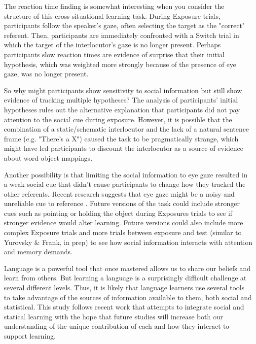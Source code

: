\documentclass[10pt,letterpaper]{article}
\begin{document}
The reaction time finding is somewhat interesting when you consider the structure of this cross-situational learning task. During Exposure trials, participants follow the speaker's gaze, often selecting the target as the "correct" referent. Then, participants are immediately confronted with a Switch trial in which the target of the interlocutor's gaze is no longer present. Perhaps participants slow reaction times are evidence of surprise that their initial hypothesis, which was weighted more strongly because of the presence of eye gaze, was no longer present. 

So why might participants show sensitivity to social information but still show evidence of tracking multiple hypotheses? The analysis of participants' initial hypotheses rules out the alternative explanation that participants did not pay attention to the social cue during exposure. However, it is possible that the combination of a static/schematic interlocutor and the lack of a natural sentence frame (e.g. "There's a X") caused the task to be pragmatically strange, which might have led participants to discount the interlocutor as a source of evidence about word-object mappings. 

Another possibility is that limiting the social information to eye gaze resulted in a weak social cue that didn't cause participants to change how they tracked the other referents. Recent research suggests that eye gaze might be a noisy and unreliable cue to reference \cite{frank2013social}. Future versions of the task could include stronger cues such as pointing or holding the object during Exposures trials to see if stronger evidence would alter learning. Future versions could also include more complex Exposure trials and more trials between exposure and test (similar to Yurovsky & Frank, in prep) to see how social information interacts with attention and memory demands. 

Language is a powerful tool that once mastered allows us to share our beliefs and learn from others. But learning a language is a surprisingly difficult challenge at several different levels. Thus, it is likely that language learners use several tools to take advantage of the sources of information available to them, both social and statistical. This study follows recent work that attempts to integrate social and statical learning with the hope that future studies will increase both our understanding of the unique contribution of each and how they interact to support learning. 



\setlength{\bibleftmargin}{.125in}
\setlength{\bibindent}{-\bibleftmargin}


\end{document}

